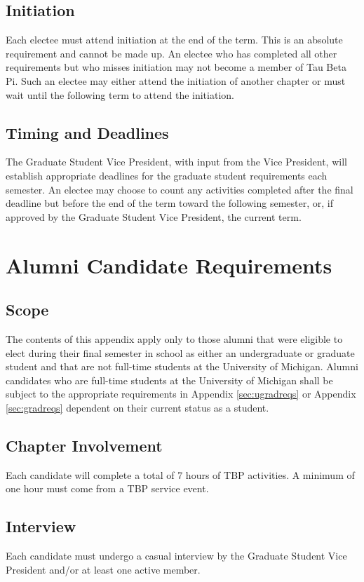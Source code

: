 \section{Initiation}	Each electee must attend initiation at the end of the term. This is an absolute requirement and cannot be made up. An electee who has completed all other requirements but who misses initiation may not become a member of Tau Beta Pi. Such an electee may either attend the initiation of another chapter or must wait until the following term to attend the initiation.  
\section{Timing and Deadlines}  The Graduate Student Vice President, with input from the Vice President, will establish appropriate deadlines for the graduate student requirements each semester. An electee may choose to count any activities completed after the final deadline but before the end of the term toward the following semester, or, if approved by the Graduate Student Vice President, the current term.

\chapter{Alumni Candidate Requirements}\label{sec:alumnireqs}%
\section{Scope} The contents of this appendix apply only to those alumni that were eligible to elect during their final semester in school as either an undergraduate or graduate student and that are not full-time students at the  University of Michigan. Alumni candidates who are full-time students at the University of Michigan shall be subject to the appropriate requirements in Appendix \ref{sec:ugradreqs} or Appendix \ref{sec:gradreqs} dependent on their current status as a student.

\section{Chapter Involvement} Each candidate will complete a total of 7 hours of TBP activities. A minimum of one hour must come from a TBP service event.
\section{Interview} Each candidate must undergo a casual interview by the Graduate Student Vice President and/or at least one active member. %

